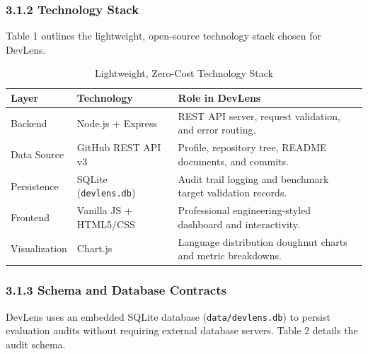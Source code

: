 \documentclass[12pt,a4paper]{article}
\begin{document}
\subsubsection{3.1.2 Technology Stack}
Table 1 outlines the lightweight, open-source technology stack chosen for DevLens.

\begin{table}[h!]
\centering
\caption{Lightweight, Zero-Cost Technology Stack}
\label{tab:techstack}
\small
\begin{tabularx}{\textwidth}{|p{2.8cm}|p{3.5cm}|X|}
\hline
\textbf{Layer} & \textbf{Technology} & \textbf{Role in DevLens} \\ \hline
Backend & Node.js + Express & REST API server, request validation, and error routing. \\ \hline
Data Source & GitHub REST API v3 & Profile, repository tree, README documents, and commits. \\ \hline
Persistence & SQLite (\texttt{devlens.db}) & Audit trail logging and benchmark target validation records. \\ \hline
Frontend & Vanilla JS + HTML5/CSS & Professional engineering-styled dashboard and interactivity. \\ \hline
Visualization & Chart.js & Language distribution doughnut charts and metric breakdowns. \\ \hline
\end{tabularx}
\end{table}

\newpage
\thispagestyle{fancy}
\subsubsection{3.1.3 Schema and Database Contracts}
DevLens uses an embedded SQLite database (\texttt{data/devlens.db}) to persist evaluation audits without requiring external database servers. Table 2 details the audit schema.
\end{document}
